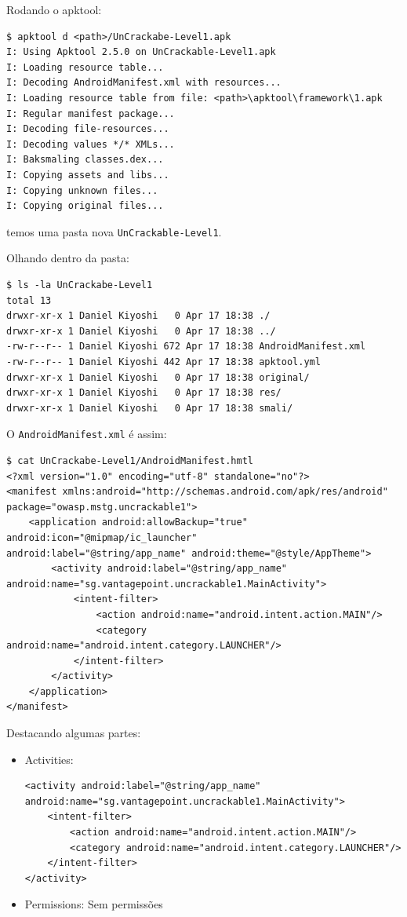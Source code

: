 \documentclass{article}
\begin{document}
Rodando o apktool:
\begin{verbatim}
$ apktool d <path>/UnCrackabe-Level1.apk
I: Using Apktool 2.5.0 on UnCrackable-Level1.apk
I: Loading resource table...
I: Decoding AndroidManifest.xml with resources...
I: Loading resource table from file: <path>\apktool\framework\1.apk
I: Regular manifest package...
I: Decoding file-resources...
I: Decoding values */* XMLs...
I: Baksmaling classes.dex...
I: Copying assets and libs...
I: Copying unknown files...
I: Copying original files...
\end{verbatim}
temos uma pasta nova \texttt{UnCrackable-Level1}.

Olhando dentro da pasta:
\begin{verbatim}
$ ls -la UnCrackabe-Level1
total 13
drwxr-xr-x 1 Daniel Kiyoshi   0 Apr 17 18:38 ./
drwxr-xr-x 1 Daniel Kiyoshi   0 Apr 17 18:38 ../
-rw-r--r-- 1 Daniel Kiyoshi 672 Apr 17 18:38 AndroidManifest.xml
-rw-r--r-- 1 Daniel Kiyoshi 442 Apr 17 18:38 apktool.yml
drwxr-xr-x 1 Daniel Kiyoshi   0 Apr 17 18:38 original/
drwxr-xr-x 1 Daniel Kiyoshi   0 Apr 17 18:38 res/
drwxr-xr-x 1 Daniel Kiyoshi   0 Apr 17 18:38 smali/
\end{verbatim}

O \texttt{AndroidManifest.xml} é assim:
\begin{verbatim}
$ cat UnCrackabe-Level1/AndroidManifest.hmtl
<?xml version="1.0" encoding="utf-8" standalone="no"?>
<manifest xmlns:android="http://schemas.android.com/apk/res/android"
package="owasp.mstg.uncrackable1">
    <application android:allowBackup="true" android:icon="@mipmap/ic_launcher"
android:label="@string/app_name" android:theme="@style/AppTheme">
        <activity android:label="@string/app_name"
android:name="sg.vantagepoint.uncrackable1.MainActivity">
            <intent-filter>
                <action android:name="android.intent.action.MAIN"/>
                <category android:name="android.intent.category.LAUNCHER"/>
            </intent-filter>
        </activity>
    </application>
</manifest>
\end{verbatim}

Destacando algumas partes:
\begin{itemize}
    \item[] Activities:
    \begin{verbatim}
<activity android:label="@string/app_name"
android:name="sg.vantagepoint.uncrackable1.MainActivity">
    <intent-filter>
        <action android:name="android.intent.action.MAIN"/>
        <category android:name="android.intent.category.LAUNCHER"/>
    </intent-filter>
</activity>
    \end{verbatim}
    \item[] Permissions:
        Sem permissões
\end{itemize}
\end{document}
